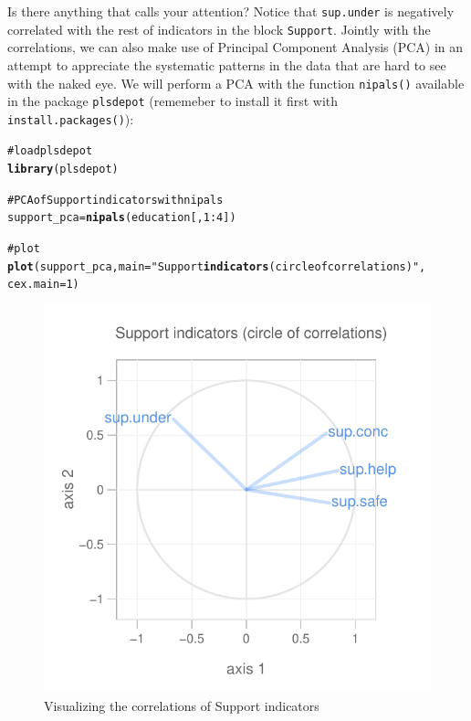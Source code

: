 \documentclass[12pt]{book}\usepackage{graphicx, color}
\makeatletter
\newcommand{\hlfunctioncall}[1]{\textcolor[rgb]{0.501960784313725,0,0.329411764705882}{\textbf{#1}}}%
\newcommand{\hlstring}[1]{\textcolor[rgb]{0.6,0.6,1}{#1}}%
\newcommand{\hlcomment}[1]{\textcolor[rgb]{0.180392156862745,0.6,0.341176470588235}{#1}}%
\newenvironment{kframe}{%
 \def\at@end@of@kframe{}%
 \ifinner\ifhmode%
  \def\at@end@of@kframe{\end{minipage}}%
  \begin{minipage}{\columnwidth}%
 \fi\fi%
 \def\FrameCommand##1{\hskip\@totalleftmargin \hskip-\fboxsep
 \colorbox{shadecolor}{##1}\hskip-\fboxsep
     \hskip-\linewidth \hskip-\@totalleftmargin \hskip\columnwidth}%
 \MakeFramed {\advance\hsize-\width
   \@totalleftmargin\z@ \linewidth\hsize
   \@setminipage}}%
 {\par\unskip\endMakeFramed%
 \at@end@of@kframe}
\newenvironment{knitrout}{}{} %
\newcommand{\code}[1]{\texttt{#1}}
\makeatother
\begin{document}
Is there anything that calls your attention? Notice that \code{sup.under} is negatively correlated with the rest of indicators in the block \code{Support}. Jointly with the correlations, we can also make use of Principal Component Analysis (PCA) in an attempt to appreciate the systematic patterns in the data that are hard to see with the naked eye. We will perform a PCA with the function \code{nipals()} available in the package \code{plsdepot} (rememeber to install it first with \code{install.packages()}):
\begin{knitrout}
\color{fgcolor}\begin{kframe}
\begin{alltt}
\hlcomment{# load plsdepot}
\hlfunctioncall{library}(plsdepot)

\hlcomment{# PCA of Support indicators with nipals}
support_pca = \hlfunctioncall{nipals}(education[,1:4])

\hlcomment{# plot}
\hlfunctioncall{plot}(support_pca, main = \hlstring{"Support \hlfunctioncall{indicators} (circle of correlations)"}, 
     cex.main = 1)
\end{alltt}
\end{kframe}\begin{figure}[h]


{\centering \includegraphics[width=.55\linewidth,height=.55\linewidth]{figure/support_nipals} 

}

\caption[Visualizing the correlations of Support indicators]{Visualizing the correlations of Support indicators\label{fig:support_nipals}}
\end{figure}


\end{knitrout}
\end{document}
